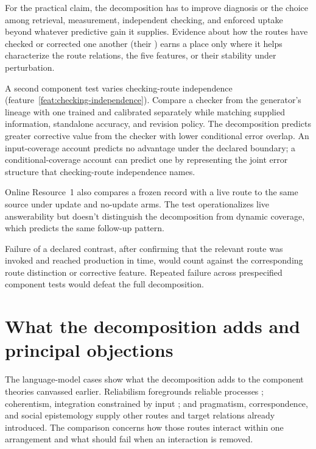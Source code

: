 \documentclass[12pt]{article}
\newcommand{\transitionpagehead}[1]{%
  \fancypagestyle{ttptransition}{%
    \fancyhf{}%
    \fancyhead[L]{\small\scshape #1}%
    \fancyhead[R]{\small\thepage}%
    \renewcommand{\headrulewidth}{0pt}%
  }%
  \thispagestyle{ttptransition}%
}
\begin{document}
For the practical claim, the decomposition has to improve diagnosis or the choice among
retrieval, measurement, independent checking, and enforced uptake
beyond whatever predictive gain it supplies. Evidence about how the routes have checked or
corrected one another (their ) earns a place only where it helps
characterize the route relations, the five features, or their stability under perturbation.

A second component test varies checking-route independence
(feature~\ref{feat:checking-independence}). Compare a checker from the generator's lineage
with one trained and calibrated separately while matching supplied information, standalone
accuracy, and revision policy. The decomposition predicts greater corrective value from the
checker with lower conditional error overlap. An input-coverage account predicts no advantage
under the declared boundary; a conditional-coverage account can predict one by representing
the joint error structure that checking-route independence names.

Online Resource~1 also compares a frozen record with a live route to the same source under
update and no-update arms. The test operationalizes live answerability but doesn't
distinguish the decomposition from dynamic coverage, which predicts the same follow-up pattern.

Failure of a declared contrast, after confirming that the relevant route was invoked and
reached production in time, would count against the corresponding route distinction or
corrective feature. Repeated failure across prespecified component tests would defeat the
full decomposition.

\transitionpagehead{5\quad Language-model arrangements}
\section[Comparisons and objections]{What the decomposition adds and principal
objections}\label{sec:adjudication}

The language-model cases show what the decomposition adds to the component theories
canvassed earlier. Reliabilism foregrounds reliable processes
\citep{goldman_1979_what_is_justified_belief}; coherentism, integration constrained by
input \citep{bonjour_1985_structure_empirical_knowledge}; and pragmatism, correspondence,
and social epistemology supply other routes and target relations already introduced. The
comparison concerns how those routes interact within one arrangement and what should fail
when an interaction is removed.
\end{document}
